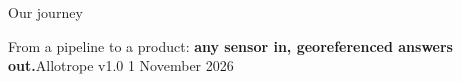 \documentclass[aspectratio=169,10pt]{beamer}
\begin{document}
\begin{frame}{Our journey}
\centering

\vspace{0.3mm}
{\small From a pipeline to a product: \textbf{any sensor in, georeferenced answers out.}\hfill{\color{mute}\footnotesize Allotrope v1.0 \textperiodcentered{} 1 November 2026}}
\end{frame}

\appendix
\renewcommand{\decklabel}{Allotrope v1.0 \textperiodcentered{} AIGC Stage III \textperiodcentered{} appendix}
\end{document}

